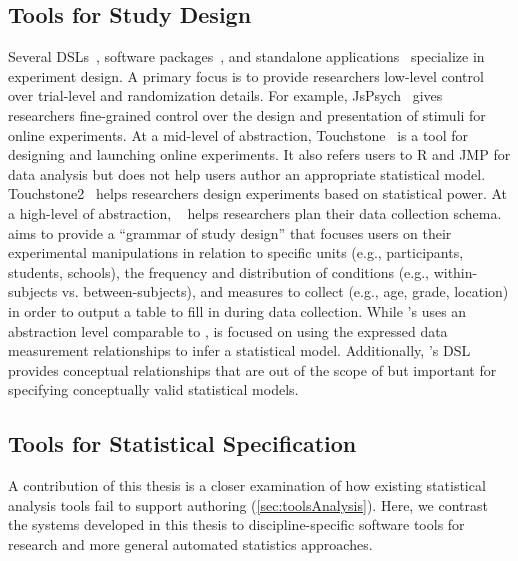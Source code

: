 \subsection{Tools for Study Design}
Several DSLs~\cite{gosset,bakshy2014planout}, software
packages~\cite{edibble,blair2019declaring}, and standalone
applications~\cite{mackay2007touchstone,eiselmayer2019touchstone2} specialize in
experiment design. A primary focus is to provide researchers low-level control
over trial-level and randomization details. For example,
JsPsych~\cite{deLeeuw2015jspsych} gives researchers fine-grained control over
the design and presentation of stimuli for online experiments. At a mid-level of
abstraction, Touchstone~\cite{mackay2007touchstone} is a %
tool for designing and launching online experiments. It also refers users to R
and JMP for data analysis but does not help users author an appropriate
statistical model. Touchstone2~\cite{eiselmayer2019touchstone2} helps
researchers design experiments based on statistical power. At a high-level of
abstraction, \edibble~\cite{edibble} helps researchers plan their data collection
schema. \edibble aims to provide a ``grammar of study design'' that focuses users
on their experimental manipulations in relation to specific units (e.g.,
participants, students, schools), the frequency and distribution of conditions
(e.g., within-subjects vs. between-subjects), and measures to collect (e.g.,
age, grade, location) in order to output a table to fill in during data
collection. While \tisane's \SDSLlong uses an abstraction level comparable to
\edibble, \tisane is focused on using the expressed data measurement relationships
to infer a statistical model. Additionally, \tisane's DSL provides conceptual
relationships that are out of the scope of \edibble but important for specifying
conceptually valid statistical models.


\subsection{Tools for Statistical Specification}
A contribution of this thesis is a closer examination of how existing
statistical analysis tools fail to support authoring
(\autoref{sec:toolsAnalysis}). Here, we contrast the systems developed in this
thesis to discipline-specific software tools for research and more general
automated statistics approaches. 

